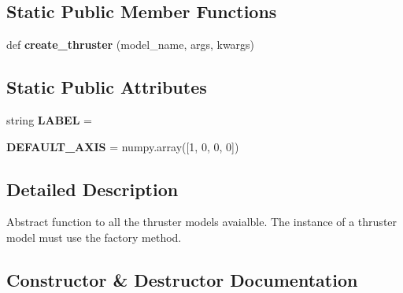 \subsection*{Static Public Member Functions}
\begin{DoxyCompactItemize}
\item 
\mbox{\label{classuuv__thrusters_1_1models_1_1thruster_1_1Thruster_a72a8d54608f8b82606f3eaa8c9454851}} 
def {\bfseries create\+\_\+thruster} (model\+\_\+name, args, kwargs)
\end{DoxyCompactItemize}
\subsection*{Static Public Attributes}
\begin{DoxyCompactItemize}
\item 
\mbox{\label{classuuv__thrusters_1_1models_1_1thruster_1_1Thruster_ac7ec40c1c035a1fc052d2a549c24e6e8}} 
string {\bfseries L\+A\+B\+EL} = \textquotesingle{}\textquotesingle{}
\item 
\mbox{\label{classuuv__thrusters_1_1models_1_1thruster_1_1Thruster_a3cca2e266275373ca6c33c4ed1488bcc}} 
{\bfseries D\+E\+F\+A\+U\+L\+T\+\_\+\+A\+X\+IS} = numpy.\+array(\mbox{[}1, 0, 0, 0\mbox{]})
\end{DoxyCompactItemize}


\subsection{Detailed Description}
\begin{DoxyVerb}Abstract function to all the thruster models avaialble. The instance
of a thruster model must use the factory method.\end{DoxyVerb}
 

\subsection{Constructor \& Destructor Documentation}
\mbox{\label{classuuv__thrusters_1_1models_1_1thruster_1_1Thruster_a5d472c0b1187de31ecbecade71fb77e9}} 
